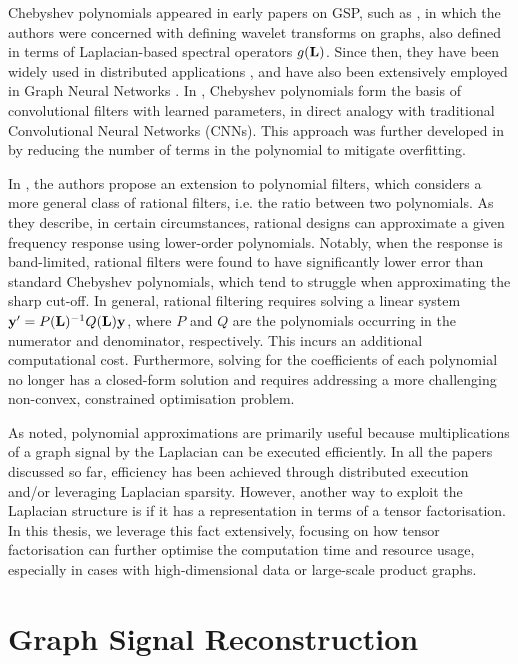 Chebyshev polynomials appeared in early papers on GSP, such as \citep{Hammond2011}, in which the authors were concerned with defining wavelet transforms on graphs, also defined in terms of Laplacian-based spectral operators $g(\mathbf{L})$. Since then, they have been widely used in distributed applications \citep{Shuman2018}, and have also been extensively employed in Graph Neural Networks \citep{Gama2020}. In \cite{Defferrard2017}, Chebyshev polynomials form the basis of convolutional filters with learned parameters, in direct analogy with traditional Convolutional Neural Networks (CNNs). This approach was further developed in \cite{Kipf2017} by reducing the number of terms in the polynomial to mitigate overfitting.

In \cite{Rimleanscaia2020, Tseng2020}, the authors propose an extension to polynomial filters, which considers a more general class of rational filters, i.e. the ratio between two polynomials. As they describe, in certain circumstances, rational designs can approximate a given frequency response using lower-order polynomials. Notably, when the response is band-limited, rational filters were found to have significantly lower error than standard Chebyshev polynomials, which tend to struggle when approximating the sharp cut-off. In general, rational filtering requires solving a linear system $\mathbf{y}' = P(\mathbf{L})^{-1} Q(\mathbf{L}) \mathbf{y}$, where $P$ and $Q$ are the polynomials occurring in the numerator and denominator, respectively. This incurs an additional computational cost. Furthermore, solving for the coefficients of each polynomial no longer has a closed-form solution and requires addressing a more challenging non-convex, constrained optimisation problem.

As noted, polynomial approximations are primarily useful because multiplications of a graph signal by the Laplacian can be executed efficiently. In all the papers discussed so far, efficiency has been achieved through distributed execution and/or leveraging Laplacian sparsity. However, another way to exploit the Laplacian structure is if it has a representation in terms of a tensor factorisation. In this thesis, we leverage this fact extensively, focusing on how tensor factorisation can further optimise the computation time and resource usage, especially in cases with high-dimensional data or large-scale product graphs.


\section{Graph Signal Reconstruction}

